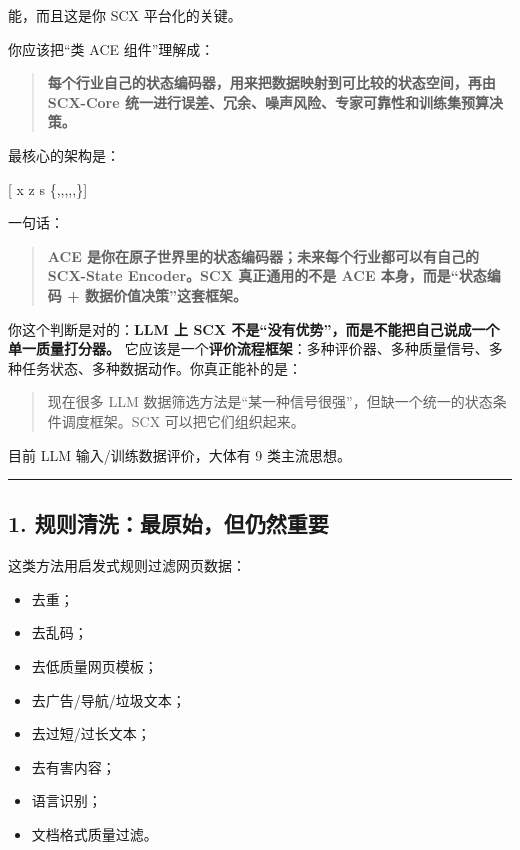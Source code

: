 \documentclass[
  12pt,
]{ctexart}
\providecommand{\tightlist}{%
  \setlength{\itemsep}{0pt}\setlength{\parskip}{0pt}}
\begin{document}
能，而且这是你 SCX 平台化的关键。

你应该把``类 ACE 组件''理解成：

\begin{quote}
\textbf{每个行业自己的状态编码器，用来把数据映射到可比较的状态空间，再由
SCX-Core 统一进行误差、冗余、噪声风险、专家可靠性和训练集预算决策。}
\end{quote}

最核心的架构是：

{[} x  z
\overset{\Pi}{\longrightarrow} s \longrightarrow
\{,,,,,\}{]}

一句话：

\begin{quote}
\textbf{ACE 是你在原子世界里的状态编码器；未来每个行业都可以有自己的
SCX-State Encoder。SCX 真正通用的不是 ACE 本身，而是``状态编码 +
数据价值决策''这套框架。}
\end{quote}

你这个判断是对的：\textbf{LLM 上 SCX
不是``没有优势''，而是不能把自己说成一个单一质量打分器。}
它应该是一个\textbf{评价流程框架}：多种评价器、多种质量信号、多种任务状态、多种数据动作。你真正能补的是：

\begin{quote}
现在很多 LLM
数据筛选方法是``某一种信号很强''，但缺一个统一的状态条件调度框架。SCX
可以把它们组织起来。
\end{quote}

目前 LLM 输入/训练数据评价，大体有 9 类主流思想。

\begin{center}\rule{0.5\linewidth}{0.5pt}\end{center}

\subsection{1.
规则清洗：最原始，但仍然重要}\label{ux89c4ux5219ux6e05ux6d17ux6700ux539fux59cbux4f46ux4ecdux7136ux91cdux8981}

这类方法用启发式规则过滤网页数据：

\begin{itemize}
\tightlist
\item
  去重；
\item
  去乱码；
\item
  去低质量网页模板；
\item
  去广告/导航/垃圾文本；
\item
  去过短/过长文本；
\item
  去有害内容；
\item
  语言识别；
\item
  文档格式质量过滤。
\end{itemize}
\end{document}
